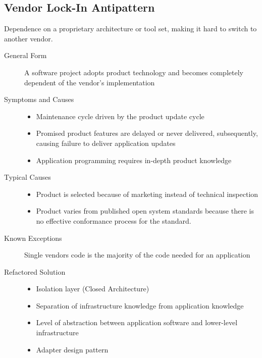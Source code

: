 \subsection{Vendor Lock-In Antipattern}
Dependence on a proprietary architecture or tool set, making it hard to switch to
another vendor.
\begin{description}
  \item[General Form] A software project adopts product technology and becomes completely dependent of the vendor's implementation
  \item[Symptoms and Causes] \hfill
  \begin{itemize}
    \item Maintenance cycle driven by the product update cycle
    \item Promised product features are delayed or never delivered, subsequently, causing failure to deliver application updates
    \item Application programming requires in-depth product knowledge
  \end{itemize}
  \item[Typical Causes] \hfill
  \begin{itemize}
    \item Product is selected because of marketing instead of technical inspection
    \item Product varies from published open system standards because there is no effective conformance process for the standard.
  \end{itemize}
  \item[Known Exceptions] Single vendors code is the majority of the code needed for an application
  \item[Refactored Solution]
  \begin{itemize}
  	\item Isolation layer (Closed Architecture)
  	\item Separation of infrastructure knowledge from application knowledge
  	\item Level of abstraction between application software and lower-level infrastructure
  	\item Adapter design pattern
  \end{itemize}
\end{description}
\newpage

